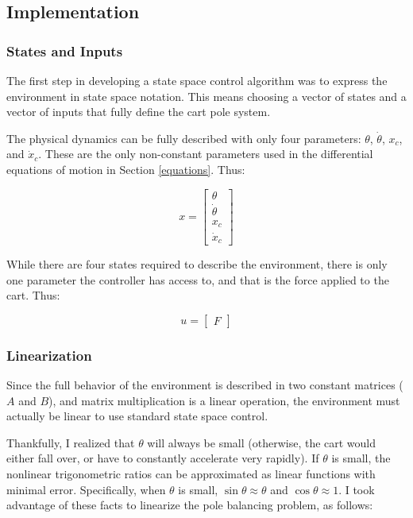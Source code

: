 \documentclass[12pt]{article}
\begin{document}
\subsection{Implementation}

\subsubsection{States and Inputs}

The first step in developing a state space control algorithm was to express the environment in state space notation. This means choosing a vector of states and a vector of inputs that fully define the cart pole system.

The physical dynamics can be fully described with only four parameters: $\theta$, $\dot \theta$, $x _c$, and $\dot x _c$. These are the only non-constant parameters used in the differential equations of motion in Section \ref{equations}. Thus:

\begin{equation}
    \displaystyle x = \begin{bmatrix}
        \theta \\
        \dot \theta \\
        x _c \\
        \dot x _c
    \end{bmatrix}
\end{equation}

While there are four states required to describe the environment, there is only one parameter the controller has access to, and that is the force applied to the cart. Thus:

\begin{equation}
    u = \begin{bmatrix}
        \displaystyle F
    \end{bmatrix}
\end{equation}

\subsubsection{Linearization}

Since the full behavior of the environment is described in two constant matrices ($A$ and $B$), and matrix multiplication is a linear operation, the environment must actually be linear to use standard state space control.

Thankfully, I realized that $\theta$ will always be small (otherwise, the cart would either fall over, or have to constantly accelerate very rapidly). If $\theta$ is small, the nonlinear trigonometric ratios can be approximated as linear functions with minimal error. Specifically, when $\theta$ is small, $\sin \theta \approx \theta$ and $\cos \theta \approx 1$. I took advantage of these facts to linearize the pole balancing problem, as follows:
\end{document}
